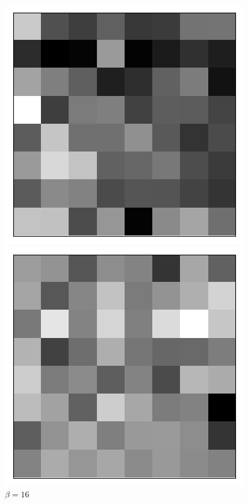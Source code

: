 \begin{figure}[h!]
\begin{multicols}{4}
    \caption{$\beta=1$}
    \includegraphics[scale=0.4]{figures/results/latent_image/beta_4_sample_10_latent.png}
    \caption{$\beta=4$}
    \includegraphics[scale=0.4]{figures/results/latent_image/beta_16_sample_10_latent.png}
    \caption{$\beta=16$}
\end{multicols}
\begin{multicols}{4}

\end{multicols}
\end{figure}
